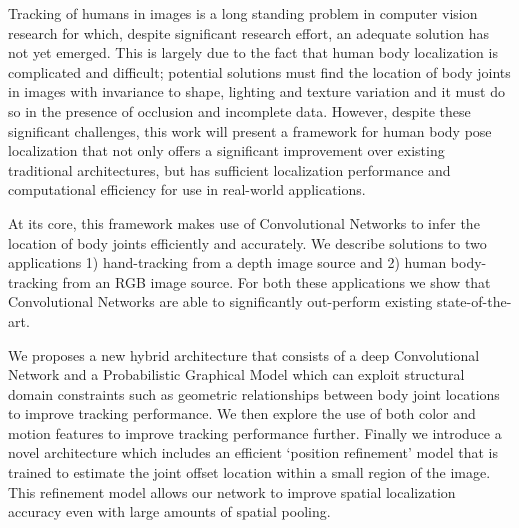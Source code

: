 Tracking of humans in images is a long standing problem in computer vision research for which, despite significant research effort, an adequate solution has not yet emerged. This is largely due to the fact that human body localization is complicated and difficult; potential solutions must find the location of body joints in images with invariance to shape, lighting and texture variation and it must do so in the presence of occlusion and incomplete data. However, despite these significant challenges, this work will present a framework for human body pose localization that not only offers a significant improvement over existing traditional architectures, but has sufficient localization performance and computational efficiency for use in real-world applications.

At its core, this framework makes use of Convolutional Networks to infer the location of body joints efficiently and accurately. We describe solutions to two applications 1) hand-tracking from a depth image source and 2) human body-tracking from an RGB image source. For both these applications we show that Convolutional Networks are able to significantly out-perform existing state-of-the-art.

We proposes a new hybrid architecture that consists of a deep Convolutional Network and a Probabilistic Graphical Model which can exploit structural domain constraints such as geometric relationships between body joint locations to improve tracking performance. We then explore the use of both color and motion features to improve tracking performance further.  Finally we introduce a novel architecture which includes an efficient `position refinement' model that is trained to estimate the joint offset location within a small region of the image. This refinement model allows our network to improve spatial localization accuracy even with large amounts of spatial pooling.